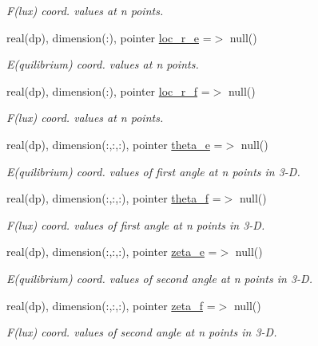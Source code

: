 \begin{DoxyCompactItemize}
\begin{DoxyCompactList}\small\item\em F(lux) coord. values at n points. \end{DoxyCompactList}\item 
real(dp), dimension(\+:), pointer \hyperlink{structgrid__vars_1_1grid__type_a898df4540526374d3f749fdbf6e0068b}{loc\+\_\+r\+\_\+e} =$>$ null()
\begin{DoxyCompactList}\small\item\em E(quilibrium) coord. values at n points. \end{DoxyCompactList}\item 
real(dp), dimension(\+:), pointer \hyperlink{structgrid__vars_1_1grid__type_afcc03f0dce24d88dfa0ae8e725238d4c}{loc\+\_\+r\+\_\+f} =$>$ null()
\begin{DoxyCompactList}\small\item\em F(lux) coord. values at n points. \end{DoxyCompactList}\item 
real(dp), dimension(\+:,\+:,\+:), pointer \hyperlink{structgrid__vars_1_1grid__type_ab0b41e4a204896b653c662b24ce1360e}{theta\+\_\+e} =$>$ null()
\begin{DoxyCompactList}\small\item\em E(quilibrium) coord. values of first angle at n points in 3-\/D. \end{DoxyCompactList}\item 
real(dp), dimension(\+:,\+:,\+:), pointer \hyperlink{structgrid__vars_1_1grid__type_a1a9efc98321f582b71ddb6d62c3e791b}{theta\+\_\+f} =$>$ null()
\begin{DoxyCompactList}\small\item\em F(lux) coord. values of first angle at n points in 3-\/D. \end{DoxyCompactList}\item 
real(dp), dimension(\+:,\+:,\+:), pointer \hyperlink{structgrid__vars_1_1grid__type_a0d866f4fcf46ea05611089afa76cbea0}{zeta\+\_\+e} =$>$ null()
\begin{DoxyCompactList}\small\item\em E(quilibrium) coord. values of second angle at n points in 3-\/D. \end{DoxyCompactList}\item 
real(dp), dimension(\+:,\+:,\+:), pointer \hyperlink{structgrid__vars_1_1grid__type_a839dff9cce6047247918fd47a87ef1fc}{zeta\+\_\+f} =$>$ null()
\begin{DoxyCompactList}\small\item\em F(lux) coord. values of second angle at n points in 3-\/D. \end{DoxyCompactList}\item 

\end{DoxyCompactItemize}
